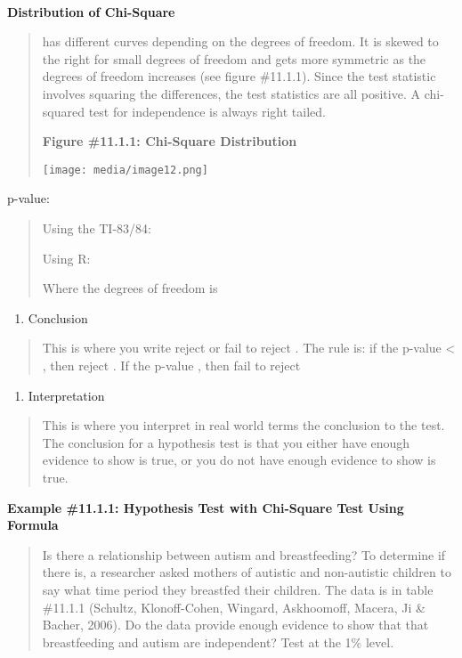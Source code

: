 \documentclass[]{book}
\providecommand{\tightlist}{%
  \setlength{\itemsep}{0pt}\setlength{\parskip}{0pt}}
\begin{document}
\textbf{\\
}

\textbf{Distribution of Chi-Square}

\begin{quote}
has different curves depending on the degrees of freedom. It is skewed
to the right for small degrees of freedom and gets more symmetric as
the degrees of freedom increases (see figure \#11.1.1). Since the test
statistic involves squaring the differences, the test statistics are
all positive. A chi-squared test for independence is always right
tailed.

\textbf{Figure \#11.1.1: Chi-Square Distribution}

\texttt{[image: media/image12.png]}
\end{quote}

p-value:

\begin{quote}
Using the TI-83/84:

Using R:

Where the degrees of freedom is
\end{quote}

\begin{enumerate}
\def\labelenumi{\arabic{enumi}.}
\setcounter{enumi}{3}
\tightlist
\item
  Conclusion
\end{enumerate}

\begin{quote}
This is where you write reject or fail to reject . The rule is: if the p-value \textless{} , then reject . If the p-value , then fail to reject
\end{quote}

\begin{enumerate}
\def\labelenumi{\arabic{enumi}.}
\setcounter{enumi}{4}
\tightlist
\item
  Interpretation
\end{enumerate}

\begin{quote}
This is where you interpret in real world terms the conclusion to the test. The conclusion for a hypothesis test is that you either have enough evidence to show is true, or you do not have enough evidence to show is true.
\end{quote}

\textbf{Example \#11.1.1: Hypothesis Test with Chi-Square Test Using Formula}

\begin{quote}
Is there a relationship between autism and breastfeeding? To determine if there is, a researcher asked mothers of autistic and non-autistic children to say what time period they breastfed their children. The data is in table \#11.1.1 (Schultz, Klonoff-Cohen, Wingard, Askhoomoff, Macera, Ji \& Bacher, 2006). Do the data provide enough evidence to show that that breastfeeding and autism are independent? Test at the 1\% level.
\end{quote}
\end{document}
